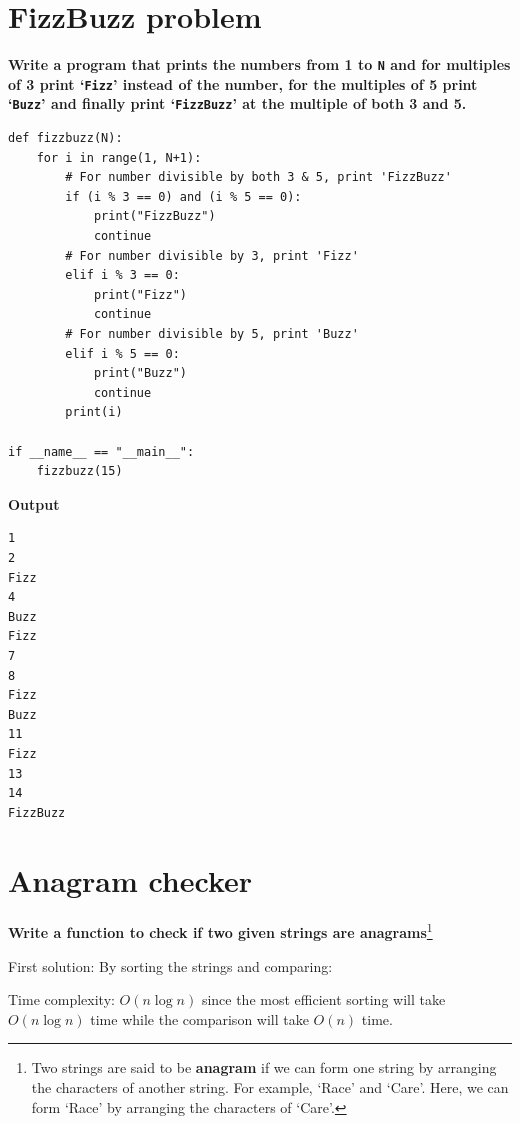 \documentclass[a4paper,11pt]{book}
\begin{document}
\newpage
\section{FizzBuzz problem}

\textbf{Write a program that prints the numbers from 1 to \lstinline{N} and for multiples of 3 print `\lstinline{Fizz}' instead of the number, for the multiples of 5 print `\lstinline{Buzz}' and finally print `\lstinline{FizzBuzz}' at the multiple of both 3 and 5.}
\vspace{5mm}
\begin{lstlisting}
def fizzbuzz(N):
    for i in range(1, N+1):
        # For number divisible by both 3 & 5, print 'FizzBuzz'
        if (i % 3 == 0) and (i % 5 == 0):
            print("FizzBuzz")                                        
            continue
        # For number divisible by 3, print 'Fizz'
        elif i % 3 == 0:    
            print("Fizz")                                        
            continue
        # For number divisible by 5, print 'Buzz'
        elif i % 5 == 0:        
            print("Buzz")                                    
            continue
        print(i)

if __name__ == "__main__":
    fizzbuzz(15)
\end{lstlisting}
\textbf{Output}
\begin{lstlisting}
1
2
Fizz
4
Buzz
Fizz
7
8
Fizz
Buzz
11
Fizz
13
14
FizzBuzz
\end{lstlisting}

\newpage
\section{Anagram checker}

\noindent \textbf{Write a function to check if two given strings are anagrams}\footnote{Two strings are said to be \textbf{anagram} if we can form one string by arranging the characters of another string. For example, `Race' and `Care'. Here, we can form `Race' by arranging the characters of `Care'.}
\vspace{5mm}

\noindent First solution: By sorting the strings and comparing:

\noindent Time complexity: $O(n\log n)$ since the most efficient sorting will take $O(n\log n)$ time while the comparison will take $O(n)$ time.
\end{document}
